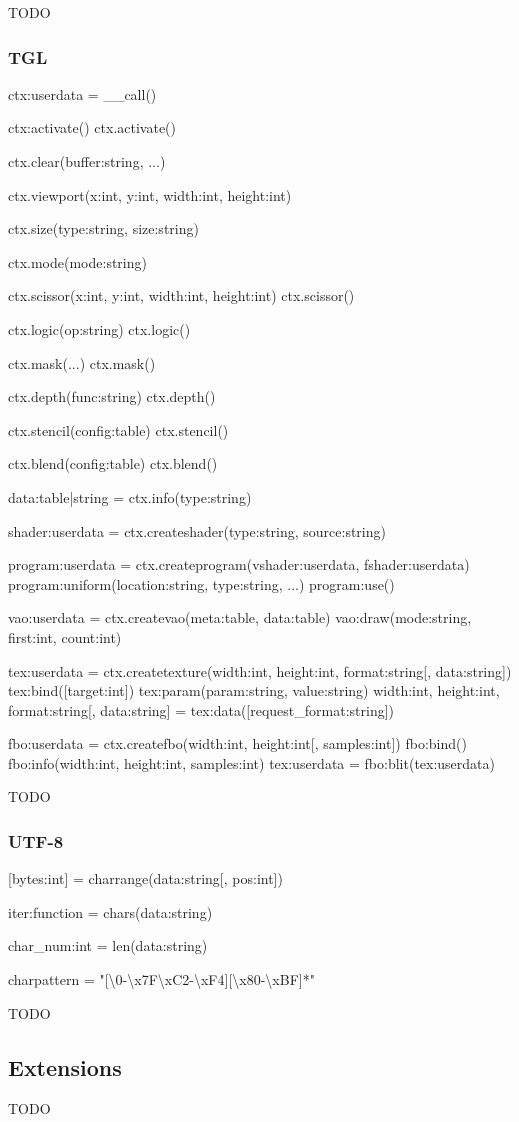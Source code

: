 TODO

\subsubsection{TGL}
\label{sec:tgl}

ctx:userdata = \_\_call()

ctx:activate()
ctx.activate()

ctx.clear(buffer:string, ...)

ctx.viewport(x:int, y:int, width:int, height:int)

ctx.size(type:string, size:string)

ctx.mode(mode:string)

ctx.scissor(x:int, y:int, width:int, height:int)
ctx.scissor()

ctx.logic(op:string)
ctx.logic()

ctx.mask(...)
ctx.mask()

ctx.depth(func:string)
ctx.depth()

ctx.stencil(config:table)
ctx.stencil()

ctx.blend(config:table)
ctx.blend()

data:table|string = ctx.info(type:string)

shader:userdata = ctx.createshader(type:string, source:string)

program:userdata = ctx.createprogram(vshader:userdata, fshader:userdata)
program:uniform(location:string, type:string, ...)
program:use()

vao:userdata = ctx.createvao(meta:table, data:table)
vao:draw(mode:string, first:int, count:int)

tex:userdata = ctx.createtexture(width:int, height:int, format:string[, data:string])
tex:bind([target:int])
tex:param(param:string, value:string)
width:int, height:int, format:string[, data:string] = tex:data([request\_format:string])

fbo:userdata = ctx.createfbo(width:int, height:int[, samples:int])
fbo:bind()
fbo:info(width:int, height:int, samples:int)
tex:userdata = fbo:blit(tex:userdata)

TODO

\subsubsection{UTF-8}
\label{sec:utf8}

[bytes:int] = charrange(data:string[, pos:int])

iter:function = chars(data:string)

char\_num:int = len(data:string)

charpattern = "[\textbackslash{}0-\textbackslash{}x7F\textbackslash{}xC2-\textbackslash{}xF4][\textbackslash{}x80-\textbackslash{}xBF]*"

TODO

\subsection{Extensions}
\label{sec:extensions}

TODO

